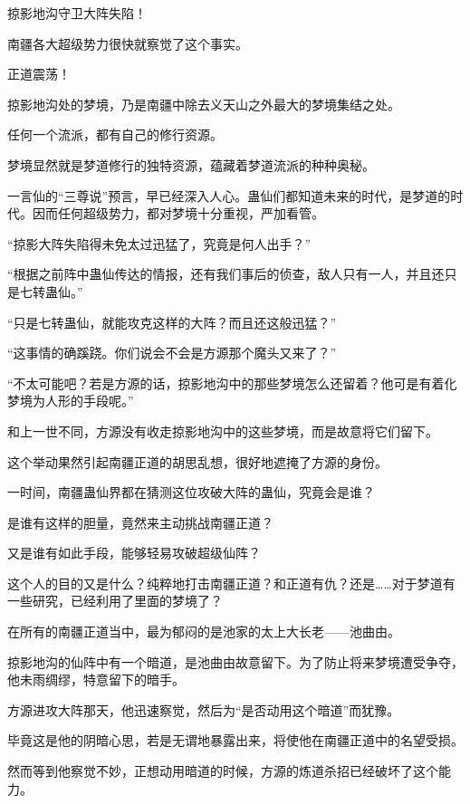 
\begin{this_body}

掠影地沟守卫大阵失陷！

南疆各大超级势力很快就察觉了这个事实。

正道震荡！

掠影地沟处的梦境，乃是南疆中除去义天山之外最大的梦境集结之处。

任何一个流派，都有自己的修行资源。

梦境显然就是梦道修行的独特资源，蕴藏着梦道流派的种种奥秘。

一言仙的“三尊说”预言，早已经深入人心。蛊仙们都知道未来的时代，是梦道的时代。因而任何超级势力，都对梦境十分重视，严加看管。

“掠影大阵失陷得未免太过迅猛了，究竟是何人出手？”

“根据之前阵中蛊仙传达的情报，还有我们事后的侦查，敌人只有一人，并且还只是七转蛊仙。”

“只是七转蛊仙，就能攻克这样的大阵？而且还这般迅猛？”

“这事情的确蹊跷。你们说会不会是方源那个魔头又来了？”

“不太可能吧？若是方源的话，掠影地沟中的那些梦境怎么还留着？他可是有着化梦境为人形的手段呢。”

和上一世不同，方源没有收走掠影地沟中的这些梦境，而是故意将它们留下。

这个举动果然引起南疆正道的胡思乱想，很好地遮掩了方源的身份。

一时间，南疆蛊仙界都在猜测这位攻破大阵的蛊仙，究竟会是谁？

是谁有这样的胆量，竟然来主动挑战南疆正道？

又是谁有如此手段，能够轻易攻破超级仙阵？

这个人的目的又是什么？纯粹地打击南疆正道？和正道有仇？还是……对于梦道有一些研究，已经利用了里面的梦境了？

在所有的南疆正道当中，最为郁闷的是池家的太上大长老——池曲由。

掠影地沟的仙阵中有一个暗道，是池曲由故意留下。为了防止将来梦境遭受争夺，他未雨绸缪，特意留下的暗手。

方源进攻大阵那天，他迅速察觉，然后为“是否动用这个暗道”而犹豫。

毕竟这是他的阴暗心思，若是无谓地暴露出来，将使他在南疆正道中的名望受损。

然而等到他察觉不妙，正想动用暗道的时候，方源的炼道杀招已经破坏了这个能力。


\end{this_body}
